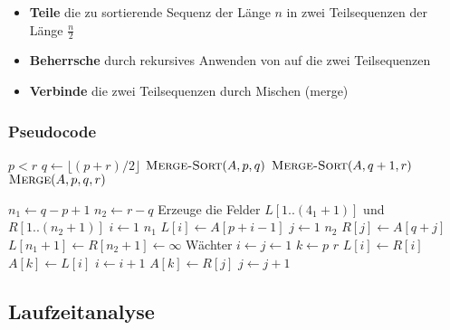 \documentclass[a4paper,twoside,DIV15,BCOR12mm]{scrbook}
\begin{document}
\begin{itemize}
	\item \textbf{Teile} die zu sortierende Sequenz der Länge $n$ in zwei Teilsequenzen der Länge $\frac{n}{2}$
	\item \textbf{Beherrsche} durch rekursives Anwenden von  auf die zwei Teilsequenzen
	\item \textbf{Verbinde} die zwei Teilsequenzen durch Mischen (merge)	
\end{itemize}

\subsubsection*{Pseudocode}

\begin{codebox} 
\li \If $p < r$ 
\li \Then 
        $q \gets \lfloor(p + r) / 2\rfloor$ 
\li     $\textnormal{\scshape Merge-Sort}(A, p, q)$ 
\li     $\textnormal{\scshape Merge-Sort}(A, q+1, r)$ 
\li     $\textnormal{\scshape Merge}(A, p, q, r)$ 
    \End 
\end{codebox} 

\begin{codebox}
\li $n_1 \gets q - p + 1$
\li $n_2 \gets r - q$
\li Erzeuge die Felder $L[1..(4_1 + 1)]$ und $R[1..(n_2 + 1)]$
\li \For $i \gets 1$ \To $n_1$ 
\li     \Do
            $L[i] \gets A[p + i - 1]$
        \End
\li \For $j \gets 1$ \To $n_2$ 
\li     \Do
            $R[j] \gets A[q + j]$
        \End
\li $L[n_1 + 1] \gets R[n_2 + 1] \gets \infty$ \Comment Wächter
\li $i \gets j \gets 1$
\li \For $k \gets p$ \To $r$
\li     \Do \If $L[i] \gets R[i]$
\li         \Then
                $A[k] \gets L[i]$
\li             $i \gets i + 1$
\li         \Else
                $A[k] \gets R[j]$
\li             $j \gets j + 1$
\end{codebox}


\subsection{Laufzeitanalyse}
\end{document}
